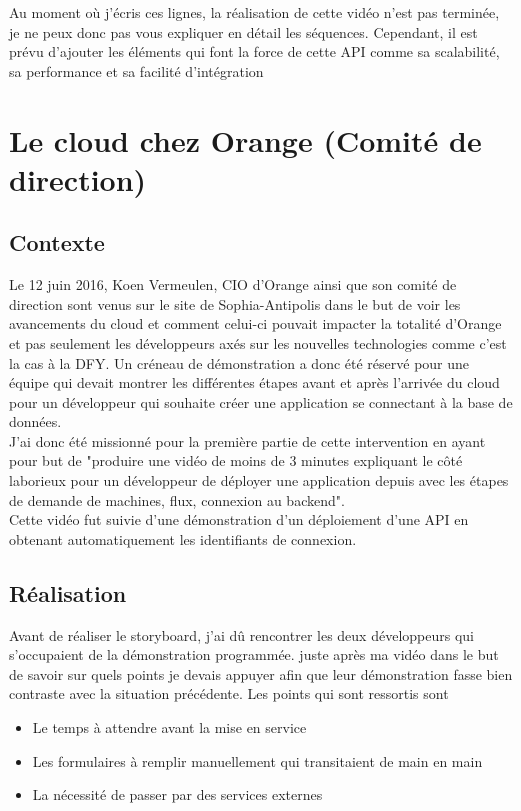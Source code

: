 Au moment où j'écris ces lignes, la réalisation de cette vidéo n'est pas terminée, je ne peux donc pas vous expliquer en détail les séquences. Cependant, il est prévu d'ajouter les éléments qui font la force de cette API comme sa scalabilité, sa performance et sa facilité d'intégration 



\section{Le cloud chez Orange (Comité de direction)}
\subsection{Contexte}
Le 12 juin 2016, Koen Vermeulen, CIO d'Orange ainsi que son comité de direction sont venus sur le site de Sophia-Antipolis dans le but de voir les avancements du cloud et comment celui-ci pouvait impacter la totalité d'Orange et pas seulement les développeurs axés sur les nouvelles technologies comme c'est la cas à la DFY. Un créneau de démonstration a donc été réservé pour une équipe qui devait montrer les différentes étapes avant et après l'arrivée du cloud pour un développeur qui souhaite créer une application se connectant à la base de données.\\

J'ai donc été missionné pour la première partie de cette intervention en ayant pour but de "produire une vidéo de moins de 3 minutes expliquant le côté laborieux pour un développeur de déployer une application depuis avec les étapes de demande de machines, flux, connexion au backend".\\

Cette vidéo fut suivie d'une démonstration d'un déploiement d'une API en obtenant automatiquement les identifiants de connexion.

\subsection{Réalisation}
Avant de réaliser le storyboard, j'ai dû rencontrer les deux développeurs qui s'occupaient de la démonstration programmée. juste après ma vidéo dans le but de savoir sur quels points je devais appuyer afin que leur démonstration fasse bien contraste avec la situation précédente. Les points qui sont ressortis sont

\begin{itemize}
    \item Le temps à attendre avant la mise en service
    \item Les formulaires à remplir manuellement qui transitaient de main en main
    \item La nécessité de passer par des services externes
\end{itemize}

